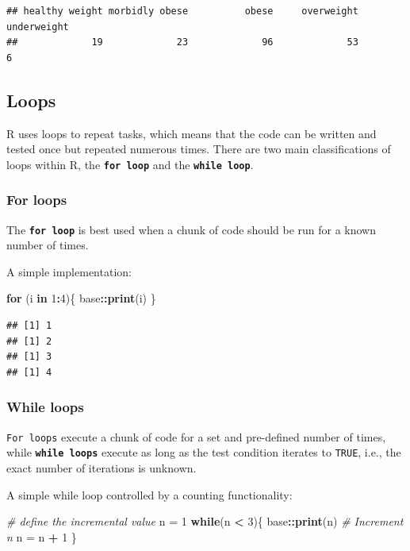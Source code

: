 \documentclass[
]{book}
\newenvironment{Shaded}{\begin{snugshade}}{\end{snugshade}}
\newcommand{\CommentTok}[1]{\textcolor[rgb]{0.56,0.35,0.01}{\textit{#1}}}
\newcommand{\ControlFlowTok}[1]{\textcolor[rgb]{0.13,0.29,0.53}{\textbf{#1}}}
\newcommand{\DecValTok}[1]{\textcolor[rgb]{0.00,0.00,0.81}{#1}}
\newcommand{\FunctionTok}[1]{\textcolor[rgb]{0.13,0.29,0.53}{\textbf{#1}}}
\newcommand{\NormalTok}[1]{#1}
\newcommand{\OtherTok}[1]{\textcolor[rgb]{0.56,0.35,0.01}{#1}}
\newcommand{\SpecialCharTok}[1]{\textcolor[rgb]{0.81,0.36,0.00}{\textbf{#1}}}
\begin{document}
\begin{verbatim}
## healthy weight morbidly obese          obese     overweight    underweight 
##             19             23             96             53              6
\end{verbatim}

\subsection{Loops}\label{sec:loops}

R uses loops to repeat tasks, which means that the code can be written and tested once but repeated numerous times. There are two main classifications of loops within R, the \textbf{\texttt{for\ loop}} and the \textbf{\texttt{while\ loop}}.

\subsubsection{For loops}\label{sec:forLoops}

The \textbf{\texttt{for\ loop}} is best used when a chunk of code should be run for a known number of times.

A simple implementation:

\begin{Shaded}
\begin{Highlighting}[]
\ControlFlowTok{for}\NormalTok{ (i }\ControlFlowTok{in} \DecValTok{1}\SpecialCharTok{:}\DecValTok{4}\NormalTok{)\{}
\NormalTok{    base}\SpecialCharTok{::}\FunctionTok{print}\NormalTok{(i)}
\NormalTok{\}}
\end{Highlighting}
\end{Shaded}

\begin{verbatim}
## [1] 1
## [1] 2
## [1] 3
## [1] 4
\end{verbatim}

\subsubsection{While loops}\label{sec:whileLoops}

\texttt{For\ loops} execute a chunk of code for a set and pre-defined number of times, while \textbf{\texttt{while\ loops}} execute as long as the test condition iterates to \texttt{TRUE}, i.e., the exact number of iterations is unknown.

A simple while loop controlled by a counting functionality:

\begin{Shaded}
\begin{Highlighting}[]
\CommentTok{\# define the incremental value}
\NormalTok{n }\OtherTok{=} \DecValTok{1}
\ControlFlowTok{while}\NormalTok{(n }\SpecialCharTok{\textless{}} \DecValTok{3}\NormalTok{)\{}
\NormalTok{    base}\SpecialCharTok{::}\FunctionTok{print}\NormalTok{(n)}
    \CommentTok{\# Increment n}
\NormalTok{    n }\OtherTok{=}\NormalTok{ n }\SpecialCharTok{+} \DecValTok{1}
\NormalTok{\}}
\end{Highlighting}
\end{Shaded}
\end{document}
